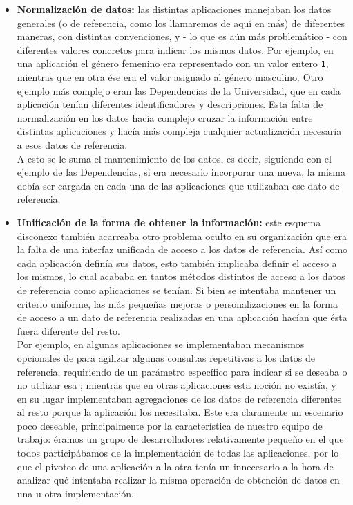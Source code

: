 \begin{itemize}
  \item \textbf{Normalización de datos:} las distintas aplicaciones manejaban los datos generales (o de referencia, como los llamaremos de aquí en más) de diferentes maneras, con distintas convenciones, y - lo que es aún más problemático - con diferentes valores concretos para indicar los mismos datos. Por ejemplo, en una aplicación el género femenino era representado con un valor entero \texttt{1}, mientras que en otra ése era el valor asignado al género masculino. Otro ejemplo más complejo eran las Dependencias de la Universidad, que en cada aplicación tenían diferentes identificadores y descripciones. Esta falta de normalización en los datos hacía complejo cruzar la información entre distintas aplicaciones y hacía más compleja cualquier actualización necesaria a esos datos de referencia.\\
  A esto se le suma el mantenimiento de los datos, es decir, siguiendo con el ejemplo de las Dependencias, si era necesario incorporar una nueva, la misma debía ser cargada en cada una de las aplicaciones que utilizaban ese dato de referencia.

  \item \textbf{Unificación de la forma de obtener la información:} este esquema disconexo también acarreaba otro problema oculto en su organización que era la falta de una interfaz unificada de acceso a los datos de referencia. Así como cada aplicación definía sus datos, esto también implicaba definir el acceso a los mismos, lo cual acababa en tantos métodos distintos de acceso a los datos de referencia como aplicaciones se tenían. Si bien se intentaba mantener un criterio uniforme, las más pequeñas mejoras o personalizaciones en la forma de acceso a un dato de referencia realizadas en una aplicación hacían que ésta fuera diferente del resto.\\
  Por ejemplo, en algunas aplicaciones se implementaban mecanismos opcionales de  para agilizar algunas consultas repetitivas a los datos de referencia, requiriendo de un parámetro específico para indicar si se deseaba o no utilizar esa ; mientras que en otras aplicaciones esta noción no existía, y en su lugar implementaban agregaciones de los datos de referencia diferentes al resto porque la aplicación los necesitaba. Este era claramente un escenario poco deseable, principalmente por la característica de nuestro equipo de trabajo: éramos un grupo de desarrolladores relativamente pequeño en el que todos participábamos de la implementación de todas las aplicaciones, por lo que el pivoteo de una aplicación a la otra tenía un  innecesario a la hora de analizar qué intentaba realizar la misma operación de obtención de datos en una u otra implementación.


\end{itemize}
